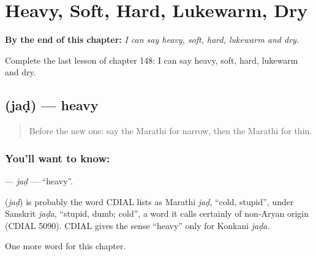 
\chapter{Heavy, Soft, Hard, Lukewarm, Dry}
\label{ch:mr-heavy-soft-hard-lukewarm-dry}

\begin{chapteropening}
\textbf{By the end of this chapter:} \emph{I can say heavy, soft, hard, lukewarm and dry.}

Complete the last lesson of chapter 148: I can say heavy, soft, hard, lukewarm and dry.
\end{chapteropening}

\section[\texorpdfstring{\mr{जड} (jaḍ)}{जड (jaḍ)}]{ (jaḍ) — heavy}

\label{lesson:MR-C148-jad}



\begin{quote}
Before the new one: say the Marathi for narrow, then the Marathi for thin.
\end{quote}

\subsection*{You'll want to know: }
\textbf{} — \emph{jaḍ} — \textquotedblleft{}heavy\textquotedblright{}.

\begin{cousinweb}
\textbf{} (\emph{jaḍ}) is probably the word CDIAL lists as Marathi \emph{jaḍ}, \textquotedblleft{}cold, stupid\textquotedblright{}, under Sanskrit \emph{jaḍa}, \textquotedblleft{}stupid, dumb; cold\textquotedblright{}, a word it calls certainly of non-Aryan origin (CDIAL 5090). CDIAL gives the sense \textquotedblleft{}heavy\textquotedblright{} only for Konkani \emph{jaḍa}.
\end{cousinweb}

\begin{grammarlens}[title={What you've built}]
One more word for this chapter.
\end{grammarlens}

